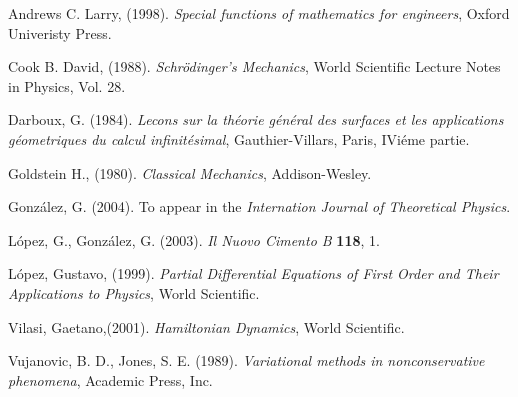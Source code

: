\newpage


\begin{thebibliography}{99}

 Andrews C. Larry, (1998). {\it Special functions of mathematics for
engineers}, Oxford Univeristy Press.

 Cook B. David, (1988). {\it Schr\"{o}dinger's
Mechanics}, World Scientific Lecture Notes in Physics, Vol. 28.

 Darboux,  G.  (1984). {\it Lecons sur la th\'eorie g\'en\'eral des
surfaces et les applications g\'eometriques du calcul
infinit\'esimal}, Gauthier-Villars, Paris, IVi\'eme partie.

 Goldstein H., (1980). {\it Classical Mechanics},
Addison-Wesley.

 Gonz\'alez, G. (2004). To appear in the {\it Internation Journal of Theoretical
Physics}.

 L\'opez, G., Gonz\'alez, G.  (2003). {\it Il Nuovo Cimento B} {\bf 118}, 1.

 L\'opez, Gustavo, (1999). {\it Partial Differential
Equations of First Order and Their Applications to Physics}, World
Scientific.

 Vilasi, Gaetano,(2001).
 {\it Hamiltonian Dynamics}, World Scientific.

 Vujanovic, B. D., Jones, S. E. (1989).
 {\it Variational methods in nonconservative
phenomena}, Academic Press, Inc.

\end{thebibliography}


